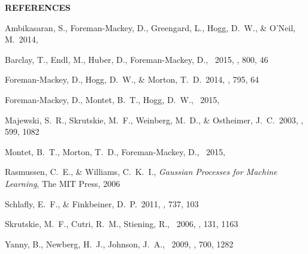 \documentclass[letterpaper,12pt,preprint]{hack_aastex}
\begin{document}
\begin{multicols}{2}
{\centering\bf REFERENCES\par}
\vspace{0.2em}
\begin{thebibliography}{}%
\raggedright\raggedbottom\scriptsize\setlength{\parskip}{-0.5em}%

Ambikasaran, S., Foreman-Mackey, D., Greengard, L., Hogg, D.~W.,
\& O'Neil, M.\ 2014, 

Barclay, T., Endl, M., Huber, D., Foreman-Mackey, D., \etal\ 2015, \apj, 800,
46

Foreman-Mackey, D., Hogg, D.~W., \& Morton, T.~D.\ 2014, \apj, 795, 64

Foreman-Mackey, D., Montet, B.~T., Hogg, D.~W., \etal\ 2015, 

Majewski, S.~R., Skrutskie, M.~F., Weinberg, M.~D., \& Ostheimer, J.~C.\ 2003,
\apj, 599, 1082

Montet, B.~T., Morton, T.~D., Foreman-Mackey, D., \etal\ 2015,

Rasmussen, C.~E., \& Williams, C.~K.~I., \emph{Gaussian Processes for Machine
Learning}, The MIT Press, 2006

Schlafly, E.~F., \& Finkbeiner, D.~P.\ 2011, \apj, 737, 103

Skrutskie, M.~F., Cutri, R.~M., Stiening, R., \etal\ 2006, \aj, 131, 1163

Yanny, B., Newberg, H.~J., Johnson, J.~A., \etal\ 2009, \apj, 700, 1282

\end{thebibliography}
\end{multicols}
\end{document}
